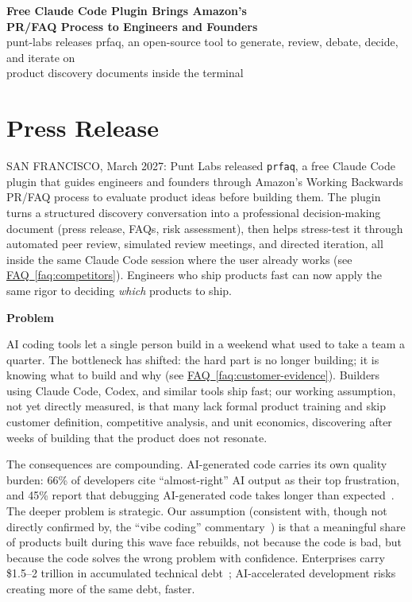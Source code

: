 \documentclass[11pt,letterpaper]{article}
\newcommand{\prsection}[1]{%
  \vspace{1em}%
  {\large\bfseries\color{SectionBlue}#1}%
  \vspace{0.3em}\par%
}
\newcommand{\faqref}[1]{\hyperref[#1]{FAQ~\ref*{#1}}}
\begin{document}
\begin{center}
  {\LARGE\bfseries\color{SectionBlue} Free Claude Code Plugin Brings Amazon's\\PR/FAQ Process to Engineers and Founders} \\[0.8em]
  {\large\color{AccentGray} punt-labs releases prfaq, an open-source tool to generate, review, debate, decide, and iterate on\\product discovery documents inside the terminal}
\end{center}

\vspace{0.5em}


\section*{Press Release}

\noindent SAN FRANCISCO, March 2027: Punt Labs released \texttt{prfaq}, a free Claude Code plugin that guides engineers and founders through Amazon's Working Backwards PR/FAQ process to evaluate product ideas before building them. The plugin turns a structured discovery conversation into a professional decision-making document (press release, FAQs, risk assessment), then helps stress-test it through automated peer review, simulated review meetings, and directed iteration, all inside the same Claude Code session where the user already works (see \faqref{faq:competitors}). Engineers who ship products fast can now apply the same rigor to deciding \textit{which} products to ship.

\prsection{Problem}

AI coding tools let a single person build in a weekend what used to take a team a quarter. The bottleneck has shifted: the hard part is no longer building; it is knowing what to build and why (see \faqref{faq:customer-evidence}). Builders using Claude Code, Codex, and similar tools ship fast; our working assumption, not yet directly measured, is that many lack formal product training and skip customer definition, competitive analysis, and unit economics, discovering after weeks of building that the product does not resonate.

The consequences are compounding. AI-generated code carries its own quality burden: 66\% of developers cite ``almost-right'' AI output as their top frustration, and 45\% report that debugging AI-generated code takes longer than expected~\cite{stackoverflow2025survey}. The deeper problem is strategic. Our assumption (consistent with, though not directly confirmed by, the ``vibe coding'' commentary~\cite{karpathy2025vibecoding}) is that a meaningful share of products built during this wave face rebuilds, not because the code is bad, but because the code solves the wrong problem with confidence. Enterprises carry \$1.5--2 trillion in accumulated technical debt~\cite{hfs2025techdebt}; AI-accelerated development risks creating more of the same debt, faster.
\end{document}
